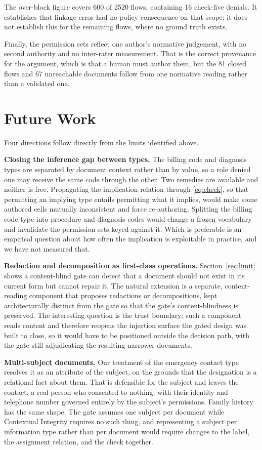 \documentclass[conference]{IEEEtran}
\begin{document}
The over-block figure covers 600 of 2520 flows, containing 16 check-five
denials. It establishes that linkage error had no policy consequence on that
scope; it does not establish this for the remaining flows, where no ground truth
exists.

Finally, the permission sets reflect one author's normative judgement, with no
second authority and no inter-rater measurement. That is the correct provenance
for the argument, which is that a human must author them, but the 81 closed
flows and 67 unreachable documents follow from one normative reading rather than
a validated one.

\section{Future Work}

Four directions follow directly from the limits identified above.

\textbf{Closing the inference gap between types.} The billing code and diagnosis
types are separated by document context rather than by value, so a role denied
one may receive the same code through the other. Two remedies are available and
neither is free. Propagating the implication relation through \eqref{eq:check},
so that permitting an implying type entails permitting what it implies, would
make some authored cells mutually inconsistent and force re-authoring. Splitting
the billing code type into procedure and diagnosis codes would change a frozen
vocabulary and invalidate the permission sets keyed against it. Which is
preferable is an empirical question about how often the implication is
exploitable in practice, and we have not measured that.

\textbf{Redaction and decomposition as first-class operations.}
Section~\ref{sec:limit} shows a content-blind gate can detect that a document
should not exist in its current form but cannot repair it. The natural extension
is a separate, content-reading component that proposes redactions or
decompositions, kept architecturally distinct from the gate so that the gate's
content-blindness is preserved. The interesting question is the trust boundary:
such a component reads content and therefore reopens the injection surface the
gated design was built to close, so it would have to be positioned outside the
decision path, with the gate still adjudicating the resulting narrower documents.

\textbf{Multi-subject documents.} Our treatment of the emergency contact type
resolves it as an attribute of the subject, on the grounds that the designation
is a relational fact about them. That is defensible for the subject and leaves
the contact, a real person who consented to nothing, with their identity and
telephone number governed entirely by the subject's permissions. Family history
has the same shape. The gate assumes one subject per document while Contextual
Integrity requires no such thing, and representing a subject per information
type rather than per document would require changes to the label, the assignment
relation, and the check together.
\end{document}
